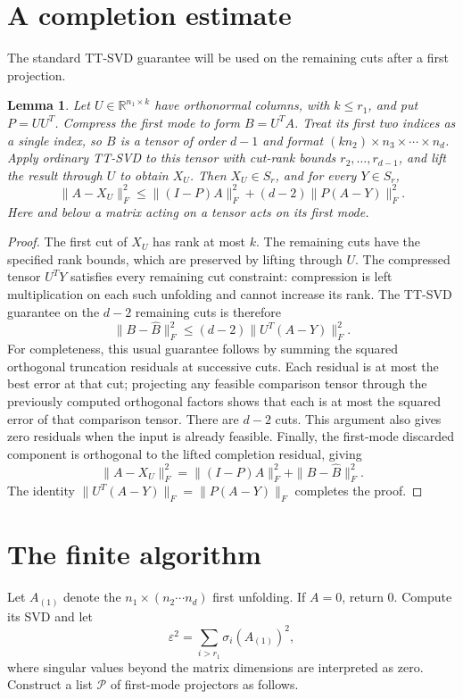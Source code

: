 \documentclass[11pt]{article}
\newtheorem{lemma}[theorem]{Lemma}
\newcommand{\R}{\mathbb R}
\begin{document}
\section{A completion estimate}
The standard TT-SVD guarantee \cite[Theorem 2.2 and Corollary 2.4]{O}
will be used on the remaining cuts after a first projection.

\begin{lemma}\label{lem:completion}
Let $U\in\R^{n_1\times k}$ have orthonormal columns, with $k\le r_1$,
and put $P=UU^T$. Compress the first mode to form $B=U^T A$.
Treat its first two indices as a single index, so $B$ is a tensor of
order $d-1$ and format $(kn_2)\times n_3\times\cdots\times n_d$.
Apply ordinary TT-SVD to this tensor with cut-rank bounds
$r_2,\ldots,r_{d-1}$, and lift the result through $U$ to obtain $X_U$.
Then $X_U\in S_r$, and for every $Y\in S_r$,
\begin{equation}\label{eq:completion}
 \|A-X_U\|_F^2
 \le \|(I-P)A\|_F^2+(d-2)\|P(A-Y)\|_F^2.
\end{equation}
Here and below a matrix acting on a tensor acts on its first mode.
\end{lemma}
\begin{proof}
The first cut of $X_U$ has rank at most $k$. The remaining cuts have the
specified rank bounds, which are preserved by lifting through $U$.
The compressed tensor $U^TY$ satisfies every remaining cut constraint:
compression is left multiplication on each such unfolding and cannot
increase its rank. The TT-SVD guarantee on the $d-2$ remaining cuts is
therefore
\[
 \|B-\widehat B\|_F^2\le(d-2)\|U^T(A-Y)\|_F^2.
\]
For completeness, this usual guarantee follows by summing the squared
orthogonal truncation residuals at successive cuts. Each residual is at
most the best error at that cut; projecting any feasible comparison
tensor through the previously computed orthogonal factors shows that
each is at most the squared error of that comparison tensor. There are
$d-2$ cuts. This argument also gives zero residuals when the input is
already feasible.
Finally, the first-mode discarded component is orthogonal to the lifted
completion residual, giving
\[
 \|A-X_U\|_F^2=\|(I-P)A\|_F^2+\|B-\widehat B\|_F^2.
\]
The identity $\|U^T(A-Y)\|_F=\|P(A-Y)\|_F$ completes the proof.
\end{proof}

\section{The finite algorithm}
Let $A_{(1)}$ denote the $n_1\times(n_2\cdots n_d)$ first unfolding.
If $A=0$, return $0$. Compute its SVD and let
\[
 \varepsilon^2=\sum_{i>r_1}\sigma_i(A_{(1)})^2,
\]
where singular values beyond the matrix dimensions are interpreted as
zero. Construct a list $\mathcal P$ of first-mode projectors as follows.
\end{document}
